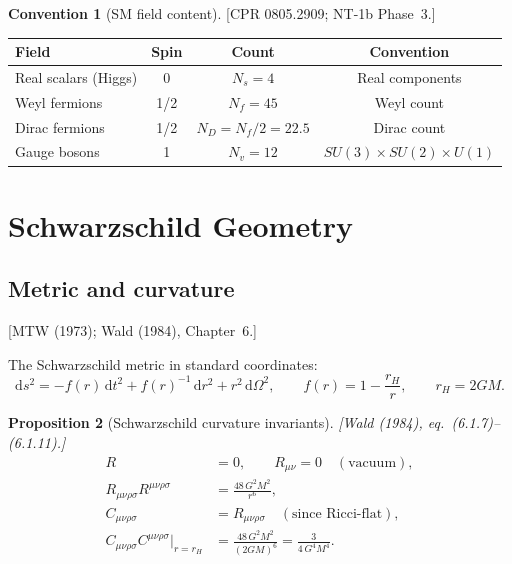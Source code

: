 \documentclass[12pt,a4paper]{article}
\newtheorem{proposition}{Proposition}[section]
\theoremstyle{definition}
\newtheorem{convention}[proposition]{Convention}
\theoremstyle{remark}
\newcommand{\Weylsq}{C_{\mu\nu\rho\sigma}C^{\mu\nu\rho\sigma}}
\newcommand{\dd}{\mathrm{d}}
\newcommand{\fromlit}[1]{\textcolor{blue!70!black}{\textsf{[#1]}}}
\begin{document}
\begin{convention}[SM field content]\label{conv:SM}
\fromlit{CPR 0805.2909; NT-1b Phase~3.}
\begin{center}
\begin{tabular}{lccc}
\toprule
Field & Spin & Count & Convention \\
\midrule
Real scalars (Higgs) & 0 & $N_s = 4$ & Real components \\
Weyl fermions & 1/2 & $N_f = 45$ & Weyl count \\
Dirac fermions & 1/2 & $N_D = N_f/2 = 22.5$ & Dirac count \\
Gauge bosons & 1 & $N_v = 12$ & $SU(3) \times SU(2) \times U(1)$ \\
\bottomrule
\end{tabular}
\end{center}
\end{convention}


\section{Schwarzschild Geometry}
\label{sec:schwarzschild}

\subsection{Metric and curvature}
\fromlit{MTW (1973); Wald (1984), Chapter~6.}

The Schwarzschild metric in standard coordinates:
\begin{equation}\label{eq:schw-metric}
  \dd s^2 = -f(r)\,\dd t^2 + f(r)^{-1}\,\dd r^2
  + r^2\,\dd\Omega^2,
  \qquad f(r) = 1 - \frac{r_H}{r},
  \qquad r_H = 2GM.
\end{equation}

\begin{proposition}[Schwarzschild curvature invariants]
\label{prop:schw-curv}
\fromlit{Wald (1984), eq.~(6.1.7)--(6.1.11).}
\begin{align}
  R &= 0, \qquad R_{\mu\nu} = 0 \quad (\text{vacuum}), \\
  R_{\mu\nu\rho\sigma}R^{\mu\nu\rho\sigma}
  &= \frac{48\,G^2 M^2}{r^6}, \label{eq:kretschner}\\
  C_{\mu\nu\rho\sigma} &= R_{\mu\nu\rho\sigma}
  \quad (\text{since Ricci-flat}), \\
  \Weylsq \Big|_{r=r_H}
  &= \frac{48\,G^2 M^2}{(2GM)^6} = \frac{3}{4\,G^4 M^4}.
  \label{eq:weyl-sq-horizon}
\end{align}
\end{proposition}
\end{document}
